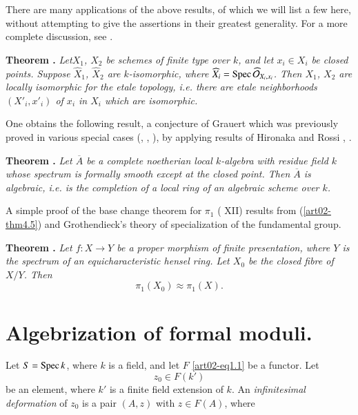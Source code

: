 There are many applications of the above results, of which we will list a few here, without attempting to give the assertions in their greatest generality. For a more complete discussion, see \cite{art02-key4}.

\medskip
\noindent
{\bf Theorem .\label{art02-thm4.6}}
{\em Let\pageoriginale $X_{1}$, $X_{2}$ be schemes of finite type over $k$, and let $x_{i}\in X_{i}$ be closed points. Suppose $\widehat{X}_{1}$, $\widehat{X}_{2}$ are $k$-isomorphic, where $\widehat{X}_{i}=\operatorname{Spec} \widehat{\mathcal{O}}_{X_{i},x_{i}}$. Then $X_{1}$, $X_{2}$ are locally isomorphic for the etale topology, i.e. there are etale neighborhoods $(X'_{i},x'_{i})$ of $x_{i}$ in $X_{i}$ which are isomorphic.}
\smallskip

One obtains the following result, a conjecture of Grauert which was previously proved in various special cases (\cite{art02-key31}, \cite{art02-key17}, \cite{art02-key2}), by applying results of Hironaka and Rossi \cite{art02-key18}, \cite{art02-key15}.

\medskip
\noindent
{\bf Theorem .\label{art02-thm4.7}}
{\em Let $\overline{A}$ be a complete noetherian local $k$-algebra with residue field $k$ whose spectrum is formally smooth except at the closed point. Then $\overline{A}$ is algebraic, i.e. is the completion of a local ring of an algebraic scheme over $k$.}
\smallskip

A simple proof of the base change theorem for $\pi_{1}$ (\cite{art02-key6} XII) results from (\ref{art02-thm4.5}) and Grothendieck's theory of specialization of the fundamental group.

\medskip
\noindent
{\bf Theorem .\label{art02-thm4.8}}
{\em Let $f:X\to Y$ be a proper morphism of finite presentation, where $Y$ is the spectrum of an equicharacteristic hensel ring. Let $X_{0}$ be the closed fibre of $X/Y$. Then}
$$
\pi_{1}(X_{0})\approx \pi_{1}(X).
$$


\section{Algebrization of formal moduli.}\label{art02-sec5}

Let $S=\operatorname{Spec} k$, where $k$ is a field, and let $F$ \eqref{art02-eq1.1} be a functor. Let
$$
z_{0}\in F(k')
$$
be an element, where $k'$ is a finite field extension of $k$. An {\em infinitesimal deformation} of $z_{0}$ is a pair $(A,z)$ with $z\in F(A)$, where

\eject

